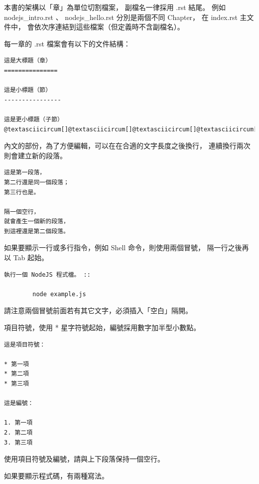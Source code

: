 \documentclass[a4paper,12pt,english]{sphinxmanual}
\begin{document}
本書的架構以「章」為單位切割檔案，
副檔名一律採用 .rst 結尾。
例如 nodejs\_intro.rst 、 nodejs\_hello.rst 分別是兩個不同 Chapter，
在 index.rst 主文件中，
會依次序連結到這些檔案（但定義時不含副檔名）。

每一章的 .rst 檔案會有以下的文件結構：

\begin{Verbatim}[commandchars=@\[\]]
這是大標題（章）
===============

這是小標題（節）
----------------

這是更小標題（子節）
@textasciicircum[]@textasciicircum[]@textasciicircum[]@textasciicircum[]@textasciicircum[]@textasciicircum[]@textasciicircum[]@textasciicircum[]@textasciicircum[]@textasciicircum[]@textasciicircum[]@textasciicircum[]@textasciicircum[]@textasciicircum[]@textasciicircum[]@textasciicircum[]@textasciicircum[]@textasciicircum[]@textasciicircum[]@textasciicircum[]
\end{Verbatim}

內文的部份，為了方便編輯，可以在在合適的文字長度之後換行，
連續換行兩次則會建立新的段落。

\begin{Verbatim}[commandchars=@\[\]]
這是第一段落，
第二行還是同一個段落；
第三行也是。

隔一個空行，
就會產生一個新的段落，
到這裡還是第二個段落。
\end{Verbatim}

如果要顯示一行或多行指令，例如 Shell 命令，則使用兩個冒號，
隔一行之後再以 Tab 起始。

\begin{Verbatim}[commandchars=@\[\]]
執行一個 NodeJS 程式檔。 ::

        node example.js
\end{Verbatim}

請注意兩個冒號前面若有其它文字，必須插入「空白」隔開。

項目符號，使用 * 星字符號起始，編號採用數字加半型小數點。

\begin{Verbatim}[commandchars=@\[\]]
這是項目符號：

* 第一項
* 第二項
* 第三項

這是編號：

1. 第一項
2. 第二項
3. 第三項
\end{Verbatim}

使用項目符號及編號，請與上下段落保持一個空行。

如果要顯示程式碼，有兩種寫法。
\end{document}
